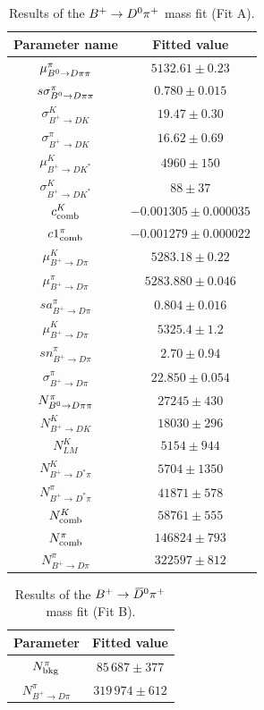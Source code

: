\begin{table}[htbp]
  \begin{center}
    \caption{Results of the $B^+\rightarrow D^0\pi^+$ mass fit (Fit A).}
    \begin{tabular}{cc}
\toprule
   Parameter name & Fitted value \\
\midrule
$\mu^{\pi}_{B^0\rightarrow D\pi\pi}$ & $5132.61\pm0.23$ \\
$s\sigma^{\pi}_{B^0\rightarrow D\pi\pi}$ & $0.780\pm0.015$ \\
$\sigma^{K}_{B^{+}\to DK}$ & $19.47\pm0.30$ \\
$\sigma^{\pi}_{B^{+}\to DK}$ & $16.62\pm0.69$ \\
$\mu^{K}_{B^{+}\to DK^{*}}$ & $4960\pm150$ \\
$\sigma^{K}_{B^{+}\to DK^{*}}$ & $88\pm37$ \\
$c^{K}_{\rm comb}$ & $-0.001305\pm0.000035$ \\
$c1^{\pi}_{\rm comb}$ & $-0.001279\pm0.000022$ \\
$\mu^{K}_{B^{+}\to D\pi}$ & $5283.18\pm0.22$ \\
$\mu^{\pi}_{B^{+}\to D\pi}$ & $5283.880\pm0.046$ \\
$sa^{\pi}_{B^{+}\to D\pi}$ & $0.804\pm0.016$ \\
$\mu^{K}_{B^{+}\to D\pi}$ & $5325.4\pm1.2$ \\
$sn^{\pi}_{B^{+}\to D\pi}$ & $2.70\pm0.94$ \\
$\sigma^{\pi}_{B^{+}\to D\pi}$ & $22.850\pm0.054$ \\
$N^{\pi}_{B^0\rightarrow D\pi\pi}$ & $27245\pm430$ \\
$N^{K}_{B^{+}\to DK}$ & $18030\pm296$ \\
$N^{K}_{LM}$ & $5154\pm944$ \\
$N^{K}_{B^{+}\to D^{*}\pi}$ & $5704\pm1350$ \\
$N^{\pi}_{B^{+}\to D^{*}\pi}$ & $41871\pm578$ \\
$N^{K}_{\rm comb}$ & $58761\pm555$ \\
$N^{\pi}_{\rm comb}$ & $146824\pm793$ \\
$N^{\pi}_{B^{+}\to D\pi}$ & $322597\pm812$ \\
\bottomrule
    \end{tabular}
    \label{tab:OSmassFitA}
  \end{center}
\end{table}

\begin{table}[htbp]
  \begin{center}
    \caption{Results of the $B^+\rightarrow\kern 0.2em\overline{\kern -0.2em D}{}^0\pi^+$ mass fit (Fit B).}
    \begin{tabular}{cc}
      \toprule
    Parameter & Fitted value \\
    \midrule
    $N^{\pi}_{\rm bkg}$ & $85\,687\pm377$ \\
    $N^{\pi}_{B^{+}\to D\pi}$ & $319\,974\pm612$ \\
    \bottomrule
    \end{tabular}
    \label{tab:OSmassFitB}
  \end{center}
\end{table}

